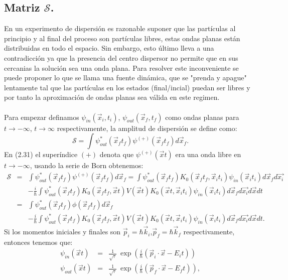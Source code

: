 \subsection{Matriz $\mathcal{S}$.}
En un experimento de dispersión es razonable suponer que las partículas al principio y al final del proceso son partículas libres, estas ondas planas están distribuidas en todo el espacio. Sin embargo, esto último lleva a una contradicción ya que la presencia del centro dispersor no permite que en sus cercanias la solución sea una onda plana. Para resolver este inconveniente se puede proponer lo que se llama una fuente dinámica, que se "prenda y apague" lentamente tal que las partículas en los estados (final/incial) puedan ser libres y por tanto la aproximación de ondas planas sea válida en este regimen.\\
\\
Para empezar definamos $\psi_{in}(\vec{x}_i,t_i)$, $\psi_{out}(\vec{x}_f,t_f)$ como ondas planas para $t\to -\infty$,  $t\to \infty$ respectivamente, la amplitud de dispersión se define como:
\begin{equation}
\mathcal{S}=\int\psi_{out}^{*}(\vec{x}_{f}t_{f})\psi^{(+)}(\vec{x}_{f}t_{f})d\vec{x}_{f}.
\end{equation}
En (2.31) el superíndice $(+)$ denota que $\psi^{(+)}(\vec{x}t)$ era una onda libre en $t\to -\infty$, usando la serie de Born obtenemos:
\begin{eqnarray}
\nonumber \mathcal{S}&=&\int\psi_{out}^{*}(\vec{x}_{f}t_{f})\psi^{(+)}(\vec{x}_{f}t_{f})d\vec{x}_{f}=\int\psi_{out}^{*}(\vec{x}_{f}t_{f})K_{0}(\vec{x}_{f}t_{f},\vec{x}_{i}t_{i})\psi_{in}(\vec{x}_{i}t_{i})d\vec{x}_{f}d\vec{x_{i}}\\
\nonumber &&-\frac{i}{\hbar}\int\psi_{out}^{*}(\vec{x}_{f}t_{f})K_{0}(\vec{x}_{f}t_{f},\vec{x}t)V(\vec{x}t)K_{0}(\vec{x}t,\vec{x}_{i}t_{i})\psi_{in}(\vec{x}_{i}t_{i})d\vec{x}_{f}d\vec{x_{i}}d\vec{x}dt\\
\nonumber &=&\int \psi_{out}^{*}(\vec{x}_{f}t_{f})\phi(\vec{x}_{f}t_{f})d\vec{x}_f\\
&&-\frac{i}{\hbar}\int\psi_{out}^{*}(\vec{x}_{f}t_{f})K_{0}(\vec{x}_{f}t_{f},\vec{x}t)V(\vec{x}t)K_{0}(\vec{x}t,\vec{x}_{i}t_{i})\psi_{in}(\vec{x}_{i}t_{i})d\vec{x}_{f}d\vec{x_{i}}d\vec{x}dt.   
\end{eqnarray}
Si los momentos iniciales y finales son $\vec{p}_i=\hbar\vec{k}_i$,$\vec{p}_f=\hbar\vec{k}_f$ respectivamente, entonces tenemos que:
\begin{eqnarray}
\psi_{in}(\vec{x}t)&=&\frac{1}{\sqrt{\tau}}\ \exp\left( \frac{i}{\hbar}(\vec{p}_i\cdot \vec{x}-E_it )\right)\\
\psi_{out}(\vec{x}t)&=&\frac{1}{\sqrt{\tau}}\ \exp\left( \frac{i}{\hbar}(\vec{p}_f\cdot \vec{x}-E_ft )\right),
\end{eqnarray}
